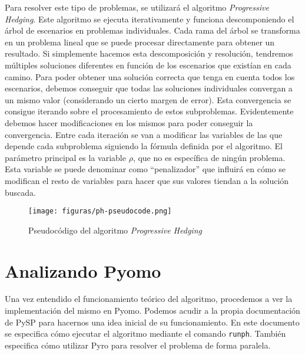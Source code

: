 Para resolver este tipo de problemas, se utilizará el algoritmo \textit{Progressive Hedging}. Este algoritmo se ejecuta iterativamente y funciona descomponiendo el árbol de escenarios en problemas individuales. Cada rama del árbol se transforma en un problema lineal que se puede procesar directamente para obtener un resultado. Si simplemente hacemos esta descomposición y resolución, tendremos múltiples soluciones diferentes en función de los escenarios que existían en cada camino. Para poder obtener una solución correcta que tenga en cuenta todos los escenarios, debemos conseguir que todas las soluciones individuales convergan a un mismo valor (considerando un cierto margen de error). Esta convergencia se consigue iterando sobre el procesamiento de estos subproblemas. Evidentemente debemos hacer modificaciones en los mismos para poder conseguir la convergencia. Entre cada iteración se van a modificar las variables de las que depende cada subproblema siguiendo la fórmula definida por el algoritmo. El parámetro principal es la variable $\rho$, que no es específica de ningún problema. Esta variable se puede denominar como ``penalizador'' que influirá en cómo se modifican el resto de variables para hacer que sus valores tiendan a la solución buscada.

\begin{figure}
    \centerline{\texttt{[image: figuras/ph-pseudocode.png]}}
    \caption{Pseudocódigo del algoritmo \textit{Progressive Hedging}}
    \label{fig:ph_pseudocode}
\end{figure}

\section{Analizando Pyomo}


Una vez entendido el funcionamiento teórico del algoritmo, procedemos a ver la implementación del mismo en Pyomo. Podemos acudir a la propia documentación de PySP para hacernos una idea inicial de su funcionamiento. En este documento \cite{local_pyspdoc} se especifica cómo ejecutar el algoritmo mediante el comando \texttt{runph}. También especifica cómo utilizar Pyro para resolver el problema de forma paralela.\\

